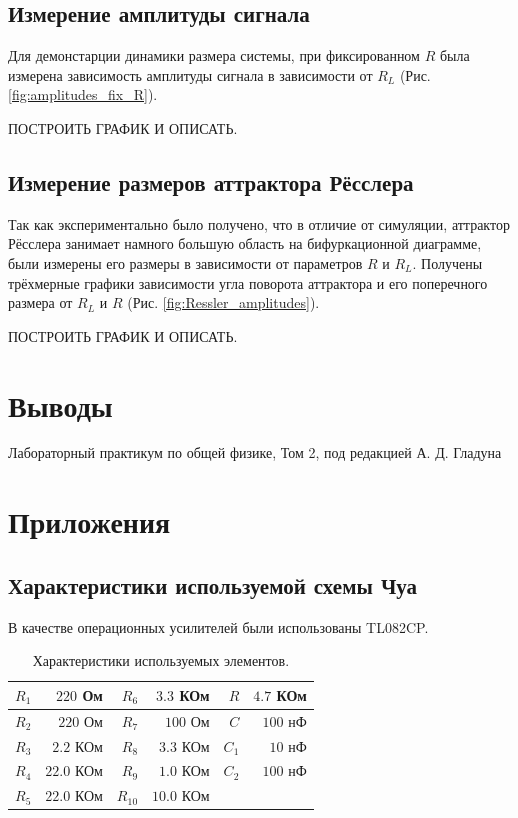 \documentclass[12pt]{article}
\begin{document}
\subsection*{Измерение амплитуды сигнала }
Для демонстарции динамики размера системы, при фиксированном $R$ была измерена зависимость 
амплитуды сигнала в зависимости от $R_L$ (Рис. \ref{fig:amplitudes_fix_R}).  

ПОСТРОИТЬ ГРАФИК И ОПИСАТЬ. 

\subsection*{Измерение размеров аттрактора Рёсслера}
Так как экспериментально было получено, что в отличие от симуляции, аттрактор 
Рёсслера занимает намного большую область на бифуркационной диаграмме, были измерены 
его размеры в зависимости от параметров $R$ и $R_L$. Получены трёхмерные графики зависимости угла поворота аттрактора и 
его поперечного размера от $R_L$ и $R$ (Рис. \ref{fig:Ressler_amplitudes}).

ПОСТРОИТЬ ГРАФИК И ОПИСАТЬ. 


\section*{Выводы}

\begin{thebibliography}{9}
	Лабораторный практикум по общей физике, Том 2, под редакцией А. Д. Гладуна
\end{thebibliography}

\section*{Приложения}
\subsection*{Характеристики используемой схемы Чуа}
В качестве операционных усилителей были использованы TL082CP.
\begin{table}[H]
	\centering
	\begin{tabular}{|r|r|r|r|r|r|}
		\hline
		$R_1$ & $220$ Ом   & $R_6$  & $3.3$ КОм  & $R$   & $4.7$ КОм \\ \hline
		$R_2$ & $220$ Ом   & $R_7$  & $100$ Ом   & $C$   & $100$ нФ  \\ \hline
		$R_3$ & $2.2$ КОм  & $R_8$  & $3.3$ КОм  & $C_1$ & $10$ нФ   \\ \hline
		$R_4$ & $22.0$ КОм & $R_9$  & $1.0$ КОм  & $C_2$ & $100$ нФ  \\ \hline
		$R_5$ & $22.0$ КОм & $R_{10}$ & $10.0$ КОм &       &           \\ \hline
	\end{tabular}
	\caption{Характеристики используемых элементов.}
	\label{tab:curcuit_chars}
\end{table}
\end{document}
